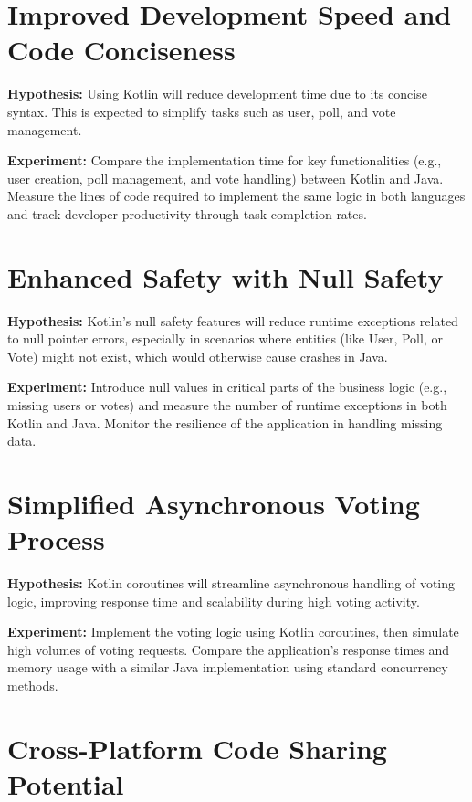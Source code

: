 \maketitle

\section*{Improved Development Speed and Code Conciseness}

\textbf{Hypothesis:} Using Kotlin will reduce development time due to its concise syntax. This is expected to simplify tasks such as user, poll, and vote management.

\textbf{Experiment:} Compare the implementation time for key functionalities (e.g., user creation, poll management, and vote handling) between Kotlin and Java. Measure the lines of code required to implement the same logic in both languages and track developer productivity through task completion rates.

\section*{Enhanced Safety with Null Safety}

\textbf{Hypothesis:} Kotlin’s null safety features will reduce runtime exceptions related to null pointer errors, especially in scenarios where entities (like User, Poll, or Vote) might not exist, which would otherwise cause crashes in Java.

\textbf{Experiment:} Introduce null values in critical parts of the business logic (e.g., missing users or votes) and measure the number of runtime exceptions in both Kotlin and Java. Monitor the resilience of the application in handling missing data.

\section*{Simplified Asynchronous Voting Process}

\textbf{Hypothesis:} Kotlin coroutines will streamline asynchronous handling of voting logic, improving response time and scalability during high voting activity.

\textbf{Experiment:} Implement the voting logic using Kotlin coroutines, then simulate high volumes of voting requests. Compare the application’s response times and memory usage with a similar Java implementation using standard concurrency methods.

\section*{Cross-Platform Code Sharing Potential}

